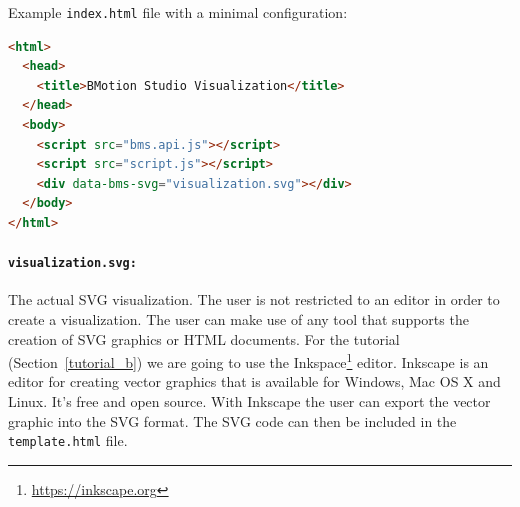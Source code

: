 Example \texttt{index.html} file with a minimal configuration:

\begin{lstlisting}[language=html]
<html>
  <head>
    <title>BMotion Studio Visualization</title>
  </head>
  <body>
    <script src="bms.api.js"></script>
    <script src="script.js"></script>
    <div data-bms-svg="visualization.svg"></div>
  </body>
</html>
\end{lstlisting}


\paragraph{\texttt{visualization.svg:}}


The actual SVG visualization.
The user is not restricted to an editor in order to create a visualization.
The user can make use of any tool that supports the creation of SVG graphics or HTML documents.
For the tutorial (Section~\ref{tutorial_b}) we are going to use the Inkspace\footnote{\url{https://inkscape.org}} editor. Inkscape is an editor for creating vector graphics that is available for Windows, Mac OS X and Linux.
It's free and open source.
With Inkscape the user can export the vector graphic into the SVG format.
The SVG code can then be included in the \texttt{template.html} file.

